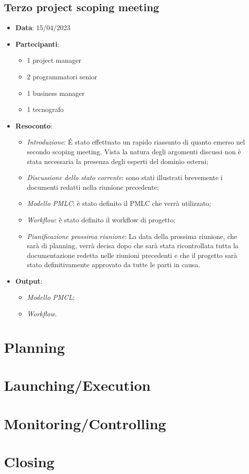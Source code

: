 \documentclass{article}
\begin{document}
  \subsection{Terzo project scoping meeting}
  \begin{itemize}
    \item \textbf{Data}: 15/04/2023
    \item \textbf{Partecipanti}:
    \begin{itemize}
      \item 1 project manager
      \item 2 programmatori senior
      \item 1 business manager
      \item 1 tecnografo
    \end{itemize}
    \item \textbf{Resoconto}:
    \begin{itemize}
      \item \emph{Introduzione}: É stato effettuato un rapido riassunto di quanto emerso nel 
        secondo scoping meeting. Vista la natura degli argomenti discussi non è stata necessaria la presenza
        degli esperti del dominio esterni;
      \item \emph{Discussione dello stato corrente}: sono stati illustrati brevemente i documenti redatti 
        nella riunione precedente;
      \item \emph{Modello PMLC}: è stato definito il PMLC che verrà utilizzato;
      \item \emph{Workflow}: è stato definito il workflow di progetto;
      \item \emph{Pianificazione prossima riunione}: La data della prossima riunione, che sarà di planning,
        verrà decisa dopo che sarà stata ricontrollata tutta la documentazione redetta nelle riunioni precedenti
        e che il progetto sarà stato definitivamente approvato da tutte le parti in causa.
    \end{itemize}
    \item \textbf{Output}:
    \begin{itemize}
      \item \emph{Modello PMCL};
      \item \emph{Workflow}.
    \end{itemize}
  \end{itemize}


  \newpage
  \section{Planning}

  \newpage
  \section{Launching/Execution}

  \newpage
  \section{Monitoring/Controlling}

  \newpage
  \section{Closing}
\end{document}
